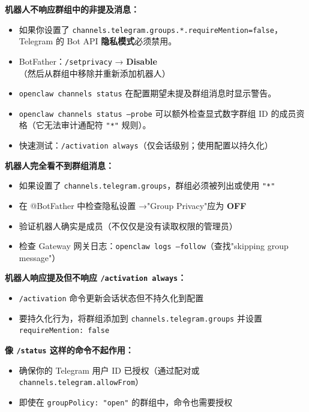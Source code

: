 \textbf{机器人不响应群组中的非提及消息：}

\begin{itemize}
  \item 如果你设置了 \texttt{channels.telegram.groups.*.requireMention=false}，Telegram 的 Bot API \textbf{隐私模式}必须禁用。
  \item BotFather：\texttt{/setprivacy} → \textbf{Disable}（然后从群组中移除并重新添加机器人）
  \item \texttt{openclaw channels status} 在配置期望未提及群组消息时显示警告。
  \item \texttt{openclaw channels status --probe} 可以额外检查显式数字群组 ID 的成员资格（它无法审计通配符 \texttt{"*"} 规则）。
  \item 快速测试：\texttt{/activation always}（仅会话级别；使用配置以持久化）
\end{itemize}


\textbf{机器人完全看不到群组消息：}

\begin{itemize}
  \item 如果设置了 \texttt{channels.telegram.groups}，群组必须被列出或使用 \texttt{"*"}
  \item 在 @BotFather 中检查隐私设置 →"Group Privacy"应为 \textbf{OFF}
  \item 验证机器人确实是成员（不仅仅是没有读取权限的管理员）
  \item 检查 Gateway 网关日志：\texttt{openclaw logs --follow}（查找"skipping group message"）
\end{itemize}


\textbf{机器人响应提及但不响应 \texttt{/activation always}：}

\begin{itemize}
  \item \texttt{/activation} 命令更新会话状态但不持久化到配置
  \item 要持久化行为，将群组添加到 \texttt{channels.telegram.groups} 并设置 \texttt{requireMention: false}
\end{itemize}


\textbf{像 \texttt{/status} 这样的命令不起作用：}

\begin{itemize}
  \item 确保你的 Telegram 用户 ID 已授权（通过配对或 \texttt{channels.telegram.allowFrom}）
  \item 即使在 \texttt{groupPolicy: "open"} 的群组中，命令也需要授权
\end{itemize}


